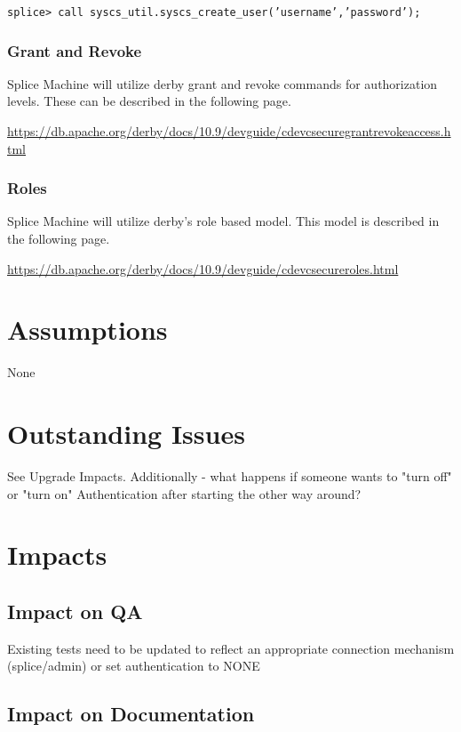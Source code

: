 \documentclass{article}
\begin{document}
\texttt{splice> call syscs\_util.syscs\_create\_user('username','password');}

\subsubsection{Grant and Revoke}

Splice Machine will utilize derby grant and revoke commands for
authorization levels.  These can be described in the following page.

\url{https://db.apache.org/derby/docs/10.9/devguide/cdevcsecuregrantrevokeaccess.html}

\subsubsection{Roles}

Splice Machine will utilize derby's role based model.  This model is described
in the following page.

\url{https://db.apache.org/derby/docs/10.9/devguide/cdevcsecureroles.html}


\section{Assumptions}

None

\section{Outstanding Issues}

See Upgrade Impacts.  Additionally - what happens if someone wants to "turn off" or "turn on" Authentication after starting the other way around?

\section{Impacts}

\subsection{Impact on QA}

Existing tests need to be updated to reflect an appropriate connection mechanism (splice/admin) or set authentication to NONE

\subsection{Impact on Documentation} 
\end{document}
